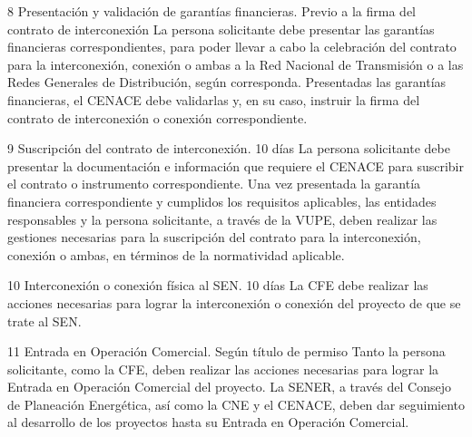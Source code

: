  8
 Presentación y validación de garantías financieras.
 Previo a la firma del contrato de interconexión
 La persona solicitante debe presentar las garantías financieras correspondientes, para poder llevar a cabo la celebración del contrato para la interconexión, conexión o ambas a la Red Nacional de Transmisión o a las Redes Generales de Distribución, según corresponda.
Presentadas las garantías financieras, el CENACE debe validarlas y, en su caso, instruir la firma del contrato de interconexión o conexión correspondiente.
 
 9
 Suscripción del contrato de interconexión.
 10 días
 La persona solicitante debe presentar la documentación e información que requiere el CENACE para suscribir el contrato o instrumento correspondiente.
Una vez presentada la garantía financiera correspondiente y cumplidos los requisitos aplicables, las entidades responsables y la persona solicitante, a través de la VUPE, deben realizar las gestiones necesarias para la suscripción del contrato para la interconexión, conexión o ambas, en términos de la normatividad aplicable.
 
 10
 Interconexión o conexión física al SEN.
 10 días
 La CFE debe realizar las acciones necesarias para lograr la interconexión o conexión del proyecto de que se trate al SEN.
 
 11
 Entrada en Operación Comercial.
 Según título de permiso
 Tanto la persona solicitante, como la CFE, deben realizar las acciones necesarias para lograr la Entrada en Operación Comercial del proyecto.
La SENER, a través del Consejo de Planeación Energética, así como la CNE y el CENACE, deben dar seguimiento al desarrollo de los proyectos hasta su Entrada en Operación Comercial.
 
